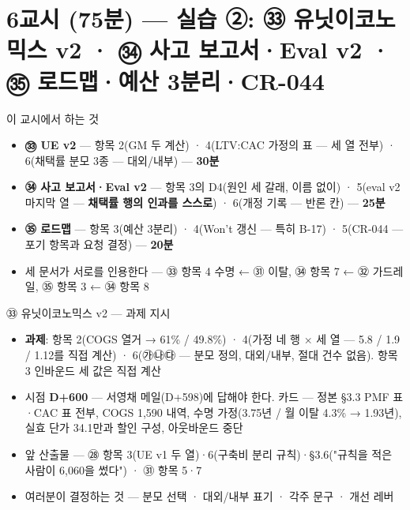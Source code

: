 \section{6교시 (75분) — 실습 ②: ㉝ 유닛이코노믹스 v2 · ㉞ 사고 보고서·Eval v2 · ㉟ 로드맵·예산 3분리·CR-044}
\begin{frame}{이 교시에서 하는 것}
\begin{itemize}
\item \textbf{㉝ UE v2} — 항목 2(GM 두 계산) · 4(LTV:CAC 가정의 표 — 세 열 전부) · 6(채택률 분모 3종 — 대외/내부) — \textbf{30분}
\item \textbf{㉞ 사고 보고서·Eval v2} — 항목 3의 D4(원인 세 갈래, 이름 없이) · 5(eval v2 마지막 열 — \textbf{채택률 행의 인과를 스스로}) · 6(개정 기록 — 반론 칸) — \textbf{25분}
\item \textbf{㉟ 로드맵} — 항목 3(예산 3분리) · 4(Won't 갱신 — 특히 B-17) · 5(CR-044 — 포기 항목과 요청 결정) — \textbf{20분}
\item 세 문서가 서로를 인용한다 — ㉝ 항목 4 수명 ← ㉛ 이탈, ㉞ 항목 7 ← ㉜ 가드레일, ㉟ 항목 3 ← ㉞ 항목 8
\end{itemize}
\end{frame}

\begin{frame}{㉝ 유닛이코노믹스 v2 — 과제 지시}
\begin{itemize}
\item \textbf{과제}: 항목 2(COGS 열거 → 61\% / 49.8\%) · 4(가정 네 행 × 세 열 — 5.8 / 1.9 / 1.12를 직접 계산) · 6(㉮㉯㉰ — 분모 정의, 대외/내부, 절대 건수 없음). 항목 3 인바운드 세 값은 직접 계산
\item 시점 \textbf{D+600} — 서영채 메일(D+598)에 답해야 한다. 카드 — 정본 §3.3 PMF 표·CAC 표 전부, COGS 1,590 내역, 수명 가정(3.75년 / 월 이탈 4.3\% → 1.93년), 실효 단가 34.1만과 할인 구성, 아웃바운드 중단
\item 앞 산출물 — ㉘ 항목 3(UE v1 두 열)·6(구축비 분리 규칙)·§3.6("규칙을 적은 사람이 6,060을 썼다") · ㉛ 항목 5·7
\item 여러분이 결정하는 것 — 분모 선택 · 대외/내부 표기 · 각주 문구 · 개선 레버
\end{itemize}
\end{frame}

